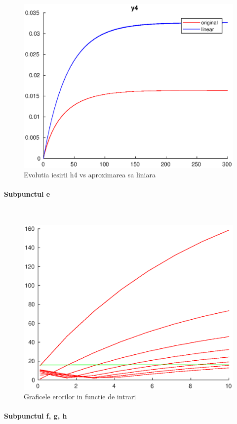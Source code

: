 \documentclass[12pt,english]{article}
\newcommand{\myparagraph}[1]{\paragraph{#1}\mbox{}\\}
\begin{document}
\begin{figure} [H]
	\includegraphics[width=1\textwidth]{d_2.eps}
	\caption{Evolutia iesirii h4 vs aproximarea sa liniara}
\end{figure}

\myparagraph {Subpunctul e}

\begin{figure} [H]
	\includegraphics[width=1\textwidth]{e_1.eps}
	\caption{Graficele erorilor in functie de intrari}
\end{figure}

\myparagraph {Subpunctul f, g, h}
\end{document}
